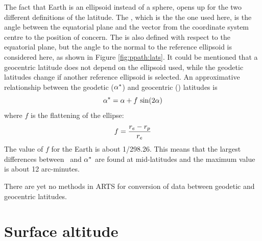 The fact that Earth is an ellipsoid instead of a sphere, opens up
for the two different definitions of the latitude. The
, which is the the one used here, is the
angle between the equatorial plane and the vector from the coordinate
system centre to the position of concern. The  is also defined with respect to the equatorial plane, but
the angle to the normal to the reference ellipsoid is considered here, as
shown in Figure \ref{fig:ppath:lats}. It could be mentioned that a
geocentric latitude does not depend on the ellipsoid used, while
the geodetic latitudes change if another reference ellipsoid is
selected. An approximative relationship between the geodetic
($\alpha^*$) and geocentric (\Lat) latitudes is \citep{montenbruck:00}
\begin{equation}
 \alpha^* = \alpha + f\,\sin(2\alpha)  
 \label{eq:ppath:lats}
\end{equation}
where $f$ is the flattening of the ellipse:
\begin{equation}
 f = \frac{r_{e}-r_{p}}{r_{e}}
 \label{eq:ppath:flattening}
\end{equation}
The value of $f$ for the Earth is about 1/298.26. This means that the
largest differences between \Lat\ and $\alpha^*$ are found at
mid-latitudes and the maximum value is about 12 arc-minutes.

There are yet no methods in ARTS for conversion of data between geodetic and
geocentric latitudes.







\section{Surface altitude}

